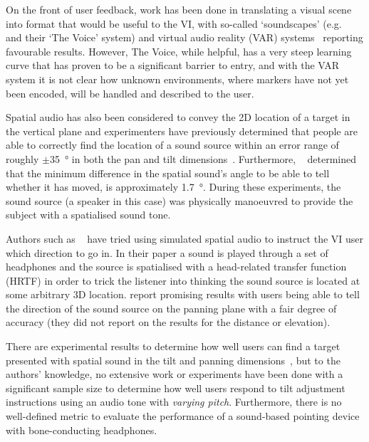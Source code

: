 \documentclass[format=sigconf, review=true, screen=true, anonymous=true]{acmart}
\begin{document}
On the front of user feedback, work has been done in translating a visual scene into format that would be useful to the VI, with so-called `soundscapes' (e.g. \citeauthor{meijer2010}~\cite{meijer2010} and their `The Voice' system) and virtual audio reality (VAR) systems~\cite{frauenberger2003} reporting favourable results. However, The Voice, while helpful, has a very steep learning curve that has proven to be a significant barrier to entry, and with the VAR system it is not clear how unknown environments, where markers have not yet been encoded, will be handled and described to the user. 

Spatial audio has also been considered to convey the 2D location of a target in the vertical plane and experimenters have previously determined that people are able to correctly find the location of a sound source within an error range of roughly $\pm$\SI{35}{\degree} in both the pan and tilt dimensions~\cite{zwiers2001spatial}. Furthermore, \citeauthor{ashmead1998spatial}~\cite{ashmead1998spatial} determined that the minimum difference in the spatial sound's angle to be able to tell whether it has moved, is approximately \SI{1.7}{\degree}. During these experiments, the sound source (a speaker in this case) was physically manoeuvred to provide the subject with a spatialised sound tone. 

Authors such as \citeauthor{holland2002audiogps}~\cite{holland2002audiogps} have tried using simulated spatial audio to instruct the VI user which direction to go in. In their paper a sound is played through a set of headphones and the source is spatialised with a head-related transfer function (HRTF) in order to trick the listener into thinking the sound source is located at some arbitrary 3D location. \citeauthor{holland2002audiogps} report promising results with users being able to tell the direction of the sound source on the panning plane with a fair degree of accuracy (they did not report on the results for the distance or elevation). %

There are experimental results to determine how well users can find a target presented with spatial sound in the tilt and panning dimensions~\cite{katz2011spatial, zwiers2001spatial}, but to the authors' knowledge, no extensive work or experiments have been done with a significant sample size to determine how well users respond to tilt adjustment instructions using an audio tone with \emph{varying pitch}. Furthermore, there is no well-defined metric to evaluate the performance of a sound-based pointing device with bone-conducting headphones. 
\end{document}
